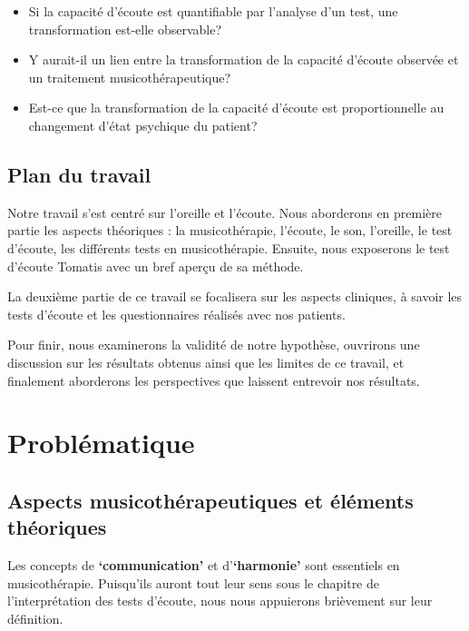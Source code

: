 \begin{itemize}
        \item Si la capacité d'écoute est quantifiable par
                 l'analyse d'un test,
          une transformation est-elle observable?
        \item Y aurait-il un lien entre la transformation de la capacité d'écoute observée  et un traitement 
        musicothérapeutique?
  \item Est-ce que la transformation de la capacité d'écoute est proportionnelle au changement 
  d'état psychique du patient?
   \end{itemize}




\section*{Plan du travail}
Notre travail s'est centré sur l'oreille et l'écoute.
Nous aborderons en première partie les aspects théoriques : la musicothérapie, l'écoute, le son, l'oreille, 
le
test d'écoute, les différents tests en musicothérapie. Ensuite, nous
exposerons le test d'écoute Tomatis avec un bref aperçu de sa méthode.

La deuxième partie de ce travail se focalisera sur les aspects
cliniques, à savoir les tests d'écoute et les questionnaires  réalisés  avec  nos patients.

Pour finir, nous examinerons la validité de notre hypothèse, ouvrirons
une discussion sur les résultats obtenus ainsi que les limites de ce
travail, et finalement aborderons les perspectives que
laissent entrevoir nos résultats.


\chapter{Problématique}

\section{Aspects musicothérapeutiques et éléments théoriques}
Les concepts de \textbf{`communication'} et  d'\textbf{`harmonie'}
sont essentiels en
musicothérapie. Puisqu'ils auront tout  leur sens sous le chapitre de l'interprétation des tests
d'écoute,  nous nous appuierons brièvement
sur leur définition. 
